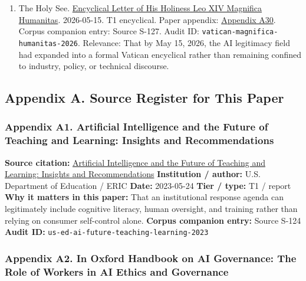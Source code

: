 \documentclass[
  american,
  11pt,
  letterpaper,
]{article}
\begin{document}
\begin{enumerate}
  factual or interpretive move inside this paper.
\item
  The Holy See.
  \href{https://www.vatican.va/content/leo-xiv/en/encyclicals/documents/20260515-magnifica-humanitas.html}{Encyclical
  Letter of His Holiness Leo XIV Magnifica Humanitas}. 2026-05-15. T1
  encyclical. Paper appendix:
  \hyperref[ch-10-appendix-a30-encyclical-letter-of-his-holiness-leo-xiv-magnifica-humanitas]{Appendix
  A30}. Corpus companion entry: Source S-127. Audit ID:
  \texttt{vatican-magnifica-humanitas-2026}. Relevance: That by May 15,
  2026, the AI legitimacy field had expanded into a formal Vatican
  encyclical rather than remaining confined to industry, policy, or
  technical discourse.
\end{enumerate}

\subsection{Appendix A. Source Register for This
Paper}\label{appendix-a.-source-register-for-this-paper-10}

\subsubsection{Appendix A1. Artificial Intelligence and the Future of
Teaching and Learning: Insights and
Recommendations}\label{ch-10-appendix-a1-artificial-intelligence-and-the-future-of-teaching-and-learning-insights-and-recommendations}

\textbf{Source citation:}
\href{https://eric.ed.gov/?id=ED631097}{Artificial Intelligence and the
Future of Teaching and Learning: Insights and Recommendations}
\textbf{Institution / author:} U.S. Department of Education / ERIC
\textbf{Date:} 2023-05-24 \textbf{Tier / type:} T1 / report \textbf{Why
it matters in this paper:} That an institutional response agenda can
legitimately include cognitive literacy, human oversight, and training
rather than relying on consumer self-control alone. \textbf{Corpus
companion entry:} Source S-124 \textbf{Audit ID:}
\texttt{us-ed-ai-future-teaching-learning-2023}

\subsubsection{Appendix A2. In Oxford Handbook on AI Governance: The
Role of Workers in AI Ethics and
Governance}\label{ch-10-appendix-a2-in-oxford-handbook-on-ai-governance-the-role-of-workers-in-ai-ethics-and-governance}
\end{document}
